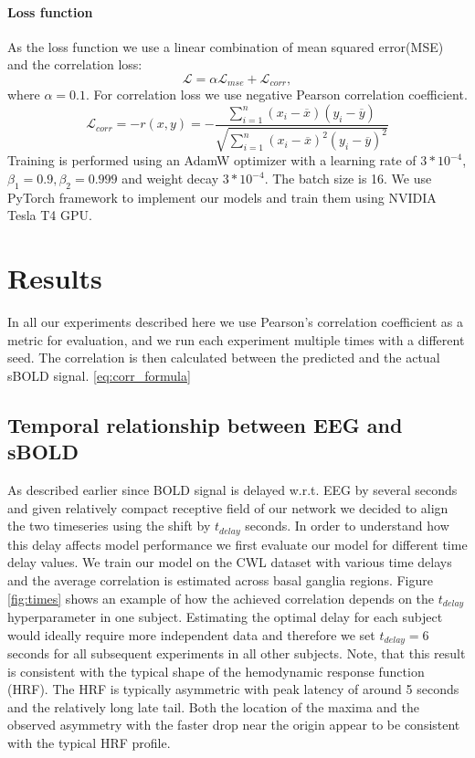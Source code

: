 \documentclass{article}
\begin{document}
\paragraph{Loss function}

As the loss function we use a  linear combination of mean squared error(MSE) and the correlation loss:
\begin{equation}
    \label{eq:total_loss}
    \mathcal{L} = \alpha \mathcal{L}_{mse} +  \mathcal{L}_{corr},
\end{equation}
where $\alpha = 0.1 $. For correlation loss we use negative Pearson correlation coefficient.
\begin{equation}
\label{eq:corr_formula}
    \mathcal{L}_{corr} = - r(x, y) = -  \frac{{}\sum_{i=1}^{n} (x_i - \overline{x})(y_i - \overline{y})}
    {\sqrt{\sum_{i=1}^{n} (x_i - \overline{x})^2(y_i - \overline{y})^2}}
\end{equation}
Training is performed using an AdamW \cite{adamw} optimizer with a learning rate of $3 * 10^{-4}$, $ \beta_1=0.9, \beta_2=0.999$ and weight decay $3 *10^{-4}$. The batch size is  16. We use PyTorch framework to implement our models and train them using NVIDIA Tesla T4 GPU.

\section{Results}
\label{section:result}
In all our experiments described here we use Pearson's correlation coefficient as a metric for evaluation, and we run each experiment multiple times with a different seed. The correlation is then calculated between the predicted and the actual sBOLD signal. \ref{eq:corr_formula}

\subsection{Temporal relationship between EEG and sBOLD }
As described earlier since BOLD signal is delayed w.r.t. EEG by several seconds and given relatively compact receptive field of our network we decided to align the two timeseries using the shift by $t_{delay}$ seconds.  In order to understand how this delay affects model performance we first evaluate our model for different time delay values. We train our model on the CWL dataset with various time delays and the average correlation is estimated across basal ganglia regions. Figure \ref{fig:times} shows an example of how the achieved correlation depends on the $t_{delay}$ hyperparameter in one subject. Estimating the optimal delay for each subject  would  ideally require more independent data and therefore we set $t_{delay}= 6$ seconds for all subsequent experiments in all other subjects. Note, that this result is  consistent with the typical shape of the hemodynamic response function (HRF). The HRF is typically asymmetric with peak latency of around 5 seconds and the relatively long late tail. Both the location of the maxima and the observed asymmetry with the faster drop near the origin appear to be consistent with the typical HRF profile.  
\end{document}
